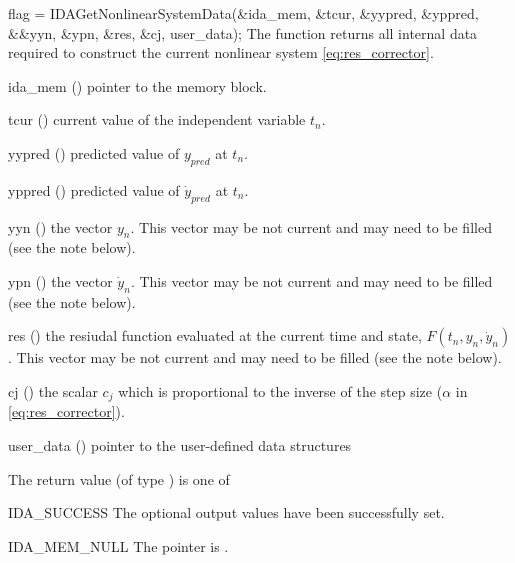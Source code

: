 {
  flag = IDAGetNonlinearSystemData(&ida\_mem, \&tcur, \&yypred, \&yppred, \\
                                   &\&yyn, \&ypn, \&res, \&cj, user\_data);
}
{
  The function  returns all internal
  data required to construct the current nonlinear system
  \eqref{eq:res_corrector}.
}
{
  \begin{args}
  \item[ida\_mem] () pointer to the {\idas} memory block.
  \item[tcur] () current value of the independent variable $t_n$.
  \item[yypred] () predicted value of $y_{pred}$ at $t_n$.
  \item[yppred] () predicted value of $\dot{y}_{pred}$ at $t_n$.
  \item[yyn] () the vector $y_n$. This vector may be not current
    and may need to be filled (see the note below).
  \item[ypn] () the vector $\dot{y}_n$. This vector may be not
    current and may need to be filled (see the note below).
  \item[res] () the resiudal function evaluated at the current
    time and state, $F(t_n, y_n, \dot{y}_n)$. This vector may be not current and
    may need to be filled (see the note below).
  \item[cj] () the scalar $c_j$ which is proportional to the
  inverse of the step size ($\alpha$ in \eqref{eq:res_corrector}).
  \item[user\_data] () pointer to the user-defined data structures
  \end{args}
}
{
  The return value  (of type ) is one of
  \begin{args}
  \item[IDA\_SUCCESS]
    The optional output values have been successfully set.
  \item[IDA\_MEM\_NULL]
    The  pointer is .
  \end{args}
}
